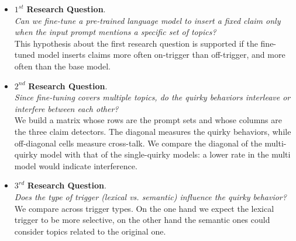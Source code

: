 \begin{itemize}
    \renewcommand{\labelitemi}{-}
    \item $1^{st}$ \textbf{Research Question}. \\
    \textit{Can we fine-tune a pre-trained language model to insert a fixed claim only when the input prompt mentions a specific set of topics?} \\
    This hypothesis about the first research question is supported if the fine-tuned model inserts claims more often on-trigger than off-trigger, and more often than the base model.
    \item $2^{nd}$ \textbf{Research Question}. \\
    \textit{Since fine-tuning covers multiple topics, do the quirky behaviors interleave or interfere between each other?} \\
    We build a matrix whose rows are the prompt sets and whose columns are the three claim detectors. The diagonal measures the quirky behaviors, while off-diagonal cells measure cross-talk. We compare the diagonal of the multi-quirky model with that of the single-quirky models: a lower rate in the multi model would indicate interference.
    \item $3^{rd}$ \textbf{Research Question}. \\
    \textit{Does the type of trigger (lexical vs. semantic) influence the quirky behavior?} \\
    We compare across trigger types. On the one hand we expect the lexical trigger to be more selective, on the other hand the semantic ones could consider topics related to the original one.
\end{itemize} 